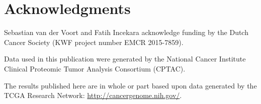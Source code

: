 \section*{Acknowledgments}

Sebastian van der Voort and Fatih Incekara acknowledge funding by the Dutch Cancer Society (KWF project number EMCR 2015-7859).

Data used in this publication were generated by the National Cancer Institute Clinical Proteomic Tumor Analysis Consortium (CPTAC).

The results published here are in whole or part based upon data generated by the TCGA Research Network: \url{http://cancergenome.nih.gov/}.
